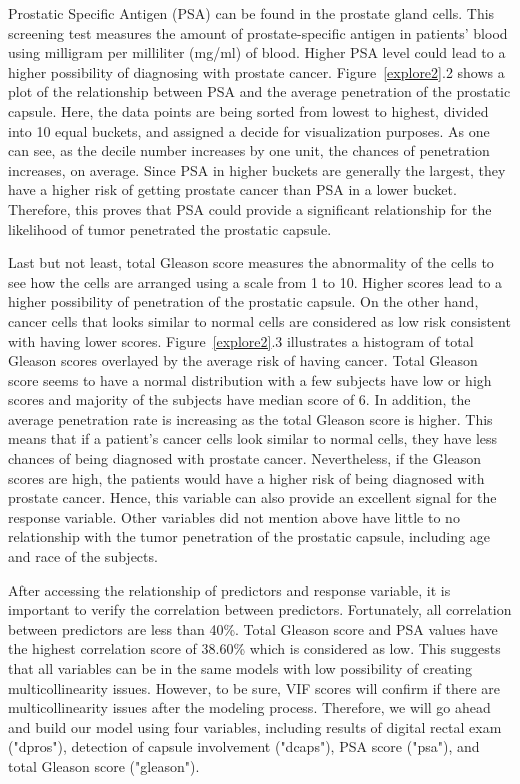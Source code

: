 \documentclass[11pt]{article}\usepackage[]{graphicx}\usepackage[]{color}
\begin{document}
Prostatic Specific Antigen (PSA) can be found in the prostate gland cells. This screening test measures the amount of prostate-specific antigen in patients' blood using milligram per milliliter (mg/ml) of blood. Higher PSA level could lead to a higher possibility of diagnosing with prostate cancer. Figure~\ref{explore2}.2 shows a plot of the relationship between PSA and the average penetration of the prostatic capsule. Here, the data points are being sorted from lowest to highest, divided into 10 equal buckets, and assigned a decide for visualization purposes. As one can see, as the decile number increases by one unit, the chances of penetration increases, on average. Since PSA in higher buckets are generally the largest, they have a higher risk of getting prostate cancer than PSA in a lower bucket. Therefore, this proves that PSA could provide a significant relationship for the likelihood of tumor penetrated the prostatic capsule.
\hfill \break

\noindent Last but not least, total Gleason score measures the abnormality of the cells to see how the cells are arranged using a scale from 1 to 10. Higher scores lead to a higher possibility of penetration of the prostatic capsule. On the other hand, cancer cells that looks similar to normal cells are considered as low risk consistent with having lower scores. Figure~\ref{explore2}.3 illustrates a histogram of total Gleason scores overlayed by the average risk of having cancer. Total Gleason score seems to have a normal distribution with a few subjects have low or high scores and majority of the subjects have median score of 6. In addition, the average penetration rate is increasing as the total Gleason score is higher. This means that if a patient's cancer cells look similar to normal cells, they have less chances of being diagnosed with prostate cancer. Nevertheless, if the Gleason scores are high, the patients would have a higher risk of being diagnosed with prostate cancer. Hence, this variable can also provide an excellent signal for the response variable. Other variables did not mention above have little to no relationship with the tumor penetration of the prostatic capsule, including age and race of the subjects.  
\hfill \break

\noindent After accessing the relationship of predictors and response variable, it is important to verify the correlation between predictors. Fortunately, all correlation between predictors are less than 40\%. Total Gleason score and PSA values have the highest correlation score of 38.60\% which is considered as low. This suggests that all variables can be in the same models with low possibility of creating multicollinearity issues. However, to be sure, VIF scores will confirm if there are multicollinearity issues after the modeling process. Therefore, we will go ahead and build our model using four variables, including results of digital rectal exam ("dpros"), detection of capsule involvement ("dcaps"), PSA score ("psa"), and total Gleason score ("gleason").
\hfill \break
\end{document}
